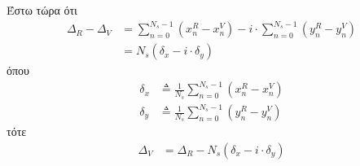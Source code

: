 Έστω τώρα ότι
\begin{align}
  \Delta_R - \Delta_V &= \sum\limits_{n=0}^{N_s-1}(x_n^R-x_n^V) - i \cdot \sum\limits_{n=0}^{N_s-1}(y_n^R-y_n^V) \nonumber \\
                      &= N_s (\delta_x - i \cdot \delta_y)
\end{align}
όπου
\begin{align}
  \delta_x &\triangleq \frac{1}{N_s}\sum\limits_{n=0}^{N_s-1}(x_n^R-x_n^V) \label{eq:delta_x}\\
  \delta_y &\triangleq \frac{1}{N_s}\sum\limits_{n=0}^{N_s-1}(y_n^R-y_n^V) \label{eq:delta_y}
\end{align}
τότε
\begin{align}
  \Delta_V &= \Delta_R -N_s(\delta_x - i \cdot \delta_y) \label{eq:Delta_V_eq_Delta_R}
\end{align}

